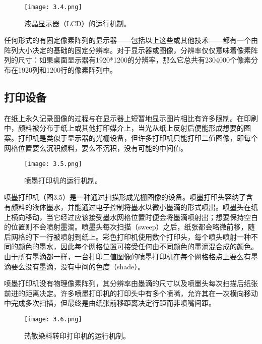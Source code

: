 \documentclass[lang=cn,12pt]{elegantbook}
\begin{document}
\begin{figure}[htb]
\centering
\texttt{[image: 3.4.png]}
\caption{液晶显示器（LCD）的运行机制。}
\end{figure}

任何形式的有固定像素阵列的显示器——包括以上这些或其他技术——都有一个由阵列大小决定的基础的固定分辨率。对于显示器或图像，分辨率仅仅意味着像素阵列的尺寸：如果桌面显示器有1920*1200的分辨率，那么它总共有2304000个像素分布在1920列和1200行的像素阵列中。


\subsection{打印设备}

在纸上永久记录图像的过程与在显示器上短暂地显示图片相比有许多限制。在印刷中，颜料被分布于纸上或其他打印媒介上，当光从纸上反射后便能形成想要的图案。打印机是类似于显示器的光栅设备，但许多打印机只能打印二值图像，即每个网格位置要么沉积颜料，要么不沉积，没有可能的中间值。

\begin{figure}[htb]
\centering
\texttt{[image: 3.5.png]}
\caption{喷墨打印机的运行机制。}
\end{figure}

喷墨打印机（图3.5）是一种通过扫描形成光栅图像的设备。喷墨打印头容纳了含有颜料的液体墨水，并能通过电子控制将墨水以微小墨滴的形式喷出。喷墨头在纸上横向移动，当它经过应该接受墨水网格位置时便会将墨滴喷射出；想要保持空白的位置则不会喷射墨滴。喷墨头每次扫描（sweep）之后，纸张都会略微前移，随后网格的下一行被喷射到纸上。彩色打印机使用数个打印头，每个喷头喷射一种不同的颜色的墨水，因此每个网格位置可接受任何由不同颜色的墨滴混合成的颜色。由于所有墨滴都一样，一台打印二值图像的喷墨打印机在每个网格格点上要么有墨滴要么没有墨滴，没有中间的色度（shade）。

喷墨打印机没有物理像素阵列，其分辨率由墨滴的尺寸以及喷墨头每次扫描后纸张前进的距离决定。许多喷墨打印机的打印头中有多个喷嘴，允许其在一次横向移动中完成多次扫描，但最终是由纸张前移距离决定行距而非喷嘴间距。


\begin{figure}[htb]
  \centering
  \texttt{[image: 3.6.png]}
  \caption{热敏染料转印打印机的运行机制。}
  \end{figure}
\end{document}
